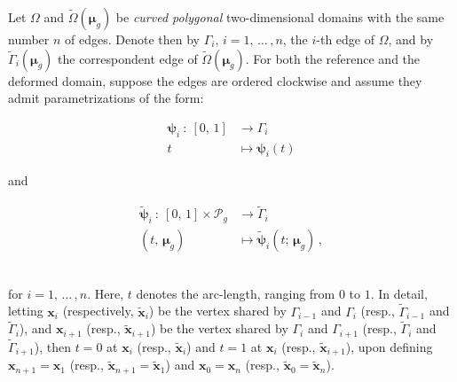 \documentclass[12pt, a4paper, twoside, openright]{report}
\numberwithin{equation}{chapter}
\theoremstyle{theorem}
\theoremstyle{definition}
\theoremstyle{remark}
\theoremstyle{proposition}
\numberwithin{figure}{chapter}
\newcommand{\wt}[1]{\widetilde{#1}}
\newcommand{\bg}[1]{\boldsymbol{#1}}
\begin{document}
		Let $\Omega$ and $\wt{\Omega}(\bg{\mu}_g)$ be \emph{curved polygonal} two-dimensional domains with the same number $n$ of edges. Denote then by $\Gamma_i$, $i = 1, \, \ldots \, , n$, the $i$-th edge of $\Omega$, and by $\wt{\Gamma}_i(\bg{\mu}_g)$ the correspondent edge of $\wt{\Omega}(\bg{\mu}_g)$. For both the reference and the deformed domain, suppose the edges are ordered clockwise and assume they admit parametrizations of the form: \\[0.2cm]
		\hspace*{1.75cm}\begin{minipage}{0.35\textwidth}
			\begin{equation*}
				\begin{aligned}
					\bg{\psi}_i ~ : ~ [0, \, 1] & \rightarrow \Gamma_i \\
					t & \mapsto \bg{\psi}_i(t)
				\end{aligned}
			\end{equation*}
		\end{minipage}
		and
		\begin{minipage}{0.45\textwidth}
			\begin{equation*}
				\begin{aligned}
					\wt{\bg{\psi}}_i ~ : ~ [0, \, 1] \times \mathcal{P}_g & \rightarrow \wt{\Gamma}_i \\
					(t, \, \bg{\mu}_g) & \mapsto \wt{\bg{\psi}}_i(t; \, \bg{\mu}_g) \, ,
				\end{aligned}
			\end{equation*}
		\end{minipage} \\[0.2cm]
		for $i = 1, \, \ldots \, , n$. Here, $t$ denotes the arc-length, ranging from $0$ to $1$. In detail, letting $\bg{x}_i$ (respectively, $\wt{\bg{x}}_i$) be the vertex shared by $\Gamma_{i-1}$ and $\Gamma_i$ (resp., $\wt{\Gamma}_{i-1}$ and $\wt{\Gamma}_i$), and $\bg{x}_{i+1}$ (resp., $\wt{\bg{x}}_{i+1}$) be the vertex shared by $\Gamma_i$ and $\Gamma_{i+1}$ (resp., $\wt{\Gamma}_i$ and $\wt{\Gamma}_{i+1}$), then $t = 0$ at $\bg{x}_i$ (resp., $\wt{\bg{x}}_i$) and $t = 1$ at $\bg{x}_i$ (resp., $\wt{\bg{x}}_{i+1}$), upon defining $\bg{x}_{n+1} = \bg{x}_1$ (resp., $\wt{\bg{x}}_{n+1} = \wt{\bg{x}}_1$) and $\bg{x}_0 = \bg{x}_n$ (resp., $\wt{\bg{x}}_0 = \wt{\bg{x}}_n$).
		
\end{document}
